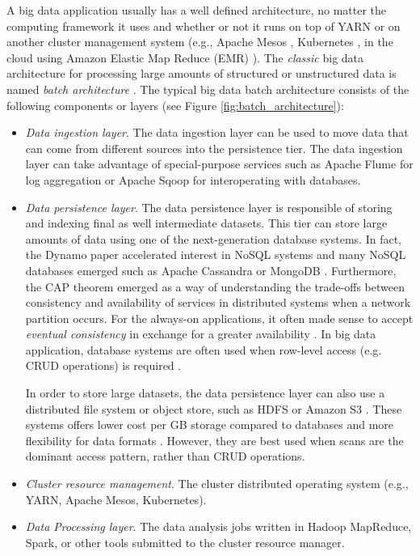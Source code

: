 A big data application usually has a well defined architecture, no matter the computing framework it uses and whether or not it runs on top of YARN or on another cluster management system (e.g., Apache Mesos  \cite{apachemesosonline}, Kubernetes \cite{kubernetesonline}, in the cloud using Amazon Elastic Map Reduce (EMR) \cite{amazonemronline}). The \emph{classic} big data architecture for processing large amounts of structured or unstructured data is named \emph{batch architecture} \cite{philosophydistributeddata, fastdataarchitecture, streamingbigdataprocessinginclouds}. The typical big data batch architecture consists of the following components or layers (see Figure \ref{fig:batch_architecture}):
\begin{itemize}
\item	 \emph{Data ingestion layer}. The data ingestion layer can be used to move data that can come from different sources into the persistence tier. The data ingestion layer can take advantage of special-purpose services such as Apache Flume \cite{apacheflumeonline} for log aggregation or Apache Sqoop \cite{apachesqooponline} for interoperating with databases.
\item \emph{Data persistence layer}. The data persistence layer is responsible of storing and indexing final as well intermediate datasets. This tier can store large amounts of data using one of the next-generation database systems. In fact, the Dynamo \cite{dynamo} paper accelerated interest in NoSQL systems and many NoSQL databases emerged such as Apache Cassandra \cite{apachecassandraonline} or MongoDB \cite{mongodbonline}. Furthermore, the CAP theorem emerged as a way of understanding the trade-offs between consistency and availability of services in distributed systems when a network partition occurs. For the always-on applications, it often made sense to accept \emph{eventual consistency} in exchange for a greater availability \cite{fastdataarchitecture}. In big data application, database systems are often used when row-level access (e.g. CRUD operations) is required \cite{fastdataarchitecture}.

In order to store large datasets, the data persistence layer can also use a distributed file system or object store, such as HDFS or Amazon S3 \cite{awss3online}. These systems offers lower cost per GB storage compared to databases and more flexibility for data formats \cite{fastdataarchitecture}. However, they are best used when scans are the dominant access pattern, rather than CRUD operations. 
\item  \emph{Cluster resource management}. The cluster distributed operating system (e.g., YARN, Apache Mesos, Kubernetes).
\item  \emph{Data Processing layer}. The data analysis jobs written in Hadoop MapReduce, Spark, or other tools submitted to the cluster resource manager.
\end{itemize}

